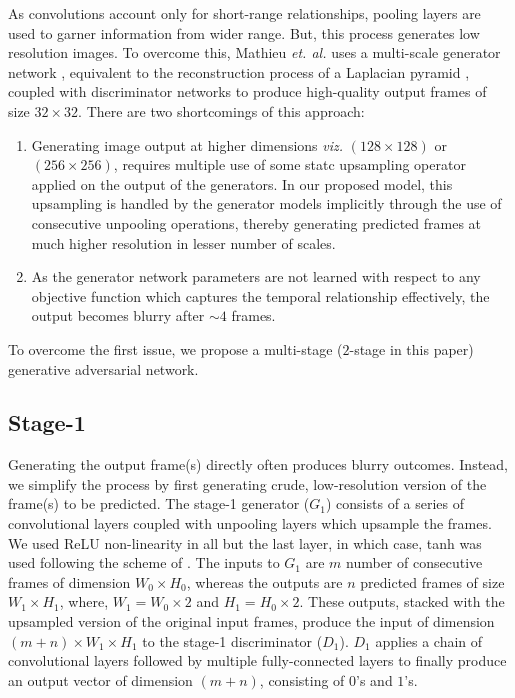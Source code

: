 \documentclass{article}
\begin{document}
  As convolutions account only for short-range relationships, pooling layers are used to garner information from wider range. But, this process generates low resolution images. To overcome this, Mathieu \textit{et. al.} \cite{mathieu2015deep} uses a multi-scale generator network , equivalent to the reconstruction process of a Laplacian pyramid \cite{denton2015deep}, coupled with discriminator networks to produce high-quality output frames of size $ 32 \times 32 $.
  There are two shortcomings of this approach:
  \renewcommand{\theenumi}{\alph{enumi}} 
  \begin{enumerate}
  	\item Generating image output at higher dimensions \textit{viz.} $ (128 \times 128) $ or $(256 \times 256) $, requires multiple use of some statc upsampling operator applied on the output of the generators. In our proposed model, this upsampling is handled by the generator models implicitly through the use of consecutive unpooling operations, thereby generating predicted frames at much higher resolution in lesser number of scales.
  	
  	\item  As the generator network parameters are not learned with respect to any objective function which captures the temporal relationship effectively, the output becomes blurry after $ \sim 4 $ frames.
  \end{enumerate}
  
  To overcome the first issue, we propose a multi-stage ($ 2 $-stage in this paper) generative adversarial network.
  
  \subsection{Stage-1}
	  Generating the output frame(s) directly often produces blurry outcomes. Instead, we simplify the process by first generating crude, low-resolution version of the frame(s) to be predicted. The stage-1 generator ($ G_1 $) consists of a series of convolutional layers coupled with unpooling layers \cite{zeiler2014visualizing} which upsample the frames. We used ReLU non-linearity in all but the last layer, in which case, tanh was used following the scheme of \cite{denton2015deep}. The inputs to $ G_1 $ are $ m $ number of consecutive frames of dimension $ W_0 \times H_0 $, whereas the outputs are $ n $ predicted frames of size $ W_1 \times H_1$, where, $ W_1 = W_0 \times 2 $ and $ H_1 = H_0 \times 2 $. These outputs, stacked with the upsampled version of the original input frames, produce the input of dimension $ (m + n) \times W_1 \times H_1 $ to the stage-1 discriminator ($ D_1 $). $ D_1 $ applies a chain of convolutional layers followed by multiple fully-connected layers to finally produce an output vector of dimension $ (m + n) $, consisting of $ 0 $'s and $ 1 $'s. 
	  
\end{document}
